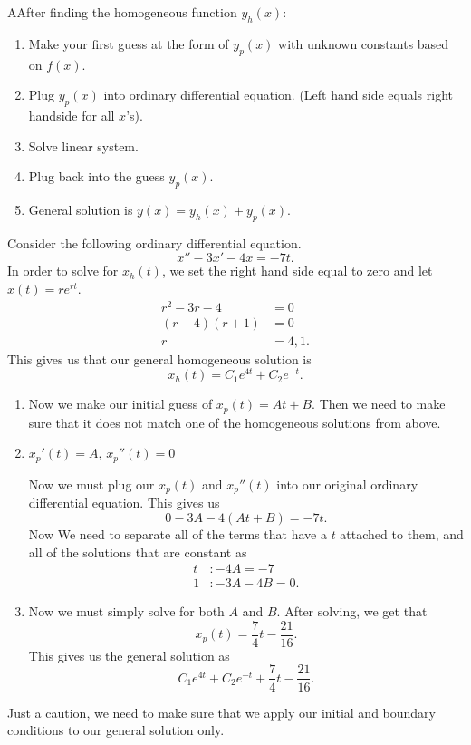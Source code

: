 \begin{theorem}
  AAfter finding the homogeneous function $y_h(x):$
  \begin{enumerate}
    \item Make your first guess at the form of $y_p(x)$ with unknown constants based on $f(x)$.
    \item Plug $y_p(x)$ into ordinary differential equation. (Left hand side equals right handside for all $x$'s).
    \item Solve linear system.
    \item Plug back into the guess $y_p(x)$.
    \item General solution is $y(x)=y_h(x)+y_p(x)$.
  \end{enumerate}
\end{theorem}

\begin{eg}
  Consider the following ordinary differential equation.
  \[
  x''-3x'-4x=-7t
  .\] 
  In order to solve for $x_h(t)$, we set the right hand side equal to zero and let $x(t)=re^{rt}$.
  \begin{align*}
    r^2-3r-4&=0\\
    (r-4)(r+1)&=0\\
    r&=4,1
  .\end{align*}
  This gives us that our general homogeneous solution is 
  \[
    x_h(t)=C_1e^{4t}+C_2e^{-t}
  .\] 
  \begin{enumerate}
    \item Now we make our initial guess of $x_p(t)=At+B$. Then we need to make sure that it does not match one of the homogeneous solutions from above.
    \item $x_p'(t)=A$, $x_p''(t)=0$
  
  Now we must plug our $x_p(t)$ and $x_p''(t)$ into our original ordinary differential equation. This gives us 
  \[
    0-3A-4(At+B)=-7t
  .\] 
  Now We need to separate all of the terms that have a $t$ attached to them, and all of the solutions that are constant as 
  \begin{align*}
    t&:-4A=-7\\
    1&:-3A-4B=0
  .\end{align*}
  \item Now we must simply solve for both $A$ and $B$. After solving, we get that 
  \[
    x_p(t)=\frac{7}{4}t-\frac{21}{16}
  .\] 
  This gives us the general solution as
  \[
  C_1e^{4t}+C_2e^{-t}+\frac{7}{4}t-\frac{21}{16}
  .\] 
  \end{enumerate}
  Just a caution, we need to make sure that we apply our initial and boundary conditions to our general solution only.
\end{eg}

